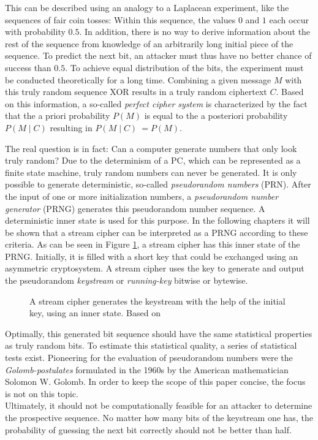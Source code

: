 This can be described using an analogy to a Laplacean experiment, like the sequences of fair coin tosses: Within this sequence, the values $0$ and $1$ each occur with probability $0.5$. In addition, there is no way to derive information about the rest of the sequence from knowledge of an arbitrarily long initial piece of the sequence. To predict the next bit, an attacker must thus have no better chance of success than $0.5$. To achieve equal distribution of the bits, the experiment must be conducted theoretically for a long time. Combining a given message $M$ with this truly random sequence XOR results in a truly random ciphertext $C$. Based on this information, a so-called \textit{perfect cipher system} is characterized by the fact that the a priori probability $P\left(M\right)$ is equal to the a posteriori probability $P({M}\mid{C})$ resulting in $P({M}\mid{C})\ = P({M})$. \cite[pp. 52-23]{Ertel.2020}

\pagebreak

The real question is in fact: Can a computer generate numbers that only look truly random? Due to the determinism of a PC, which can be represented as a finite state machine, truly random numbers can never be generated. It is only possible to generate deterministic, so-called \textit{pseudorandom numbers} (PRN). After the input of one or more initialization numbers, a \textit{pseudorandom number generator} (PRNG) generates this pseudorandom number sequence. A deterministic inner state is used for this purpose. \cite[pp. 195-196]{Ertel.2020} In the following chapters it will be shown that a stream cipher can be interpreted as a PRNG according to these criteria. As can be seen in Figure \ref{fig:Figure_2}, a stream cipher has this inner state of the PRNG. Initially, it is filled with a short key that could be exchanged using an asymmetric cryptosystem. A stream cipher uses the key to generate and output the pseudorandom \textit{keystream} or \textit{running-key} bitwise or bytewise. \cite[p. 233]{Schneier.2006} \\

\begin{figure}[h]
	\centering
	
	\caption{A stream cipher generates the keystream with the help of the initial key, using an inner state. Based on \cite[p. 234]{Schneier.2006}}
	\label{fig:Figure_2}
\end{figure}

Optimally, this generated bit sequence should have the same statistical properties as truly random bits. To estimate this statistical quality, a series of statistical tests exist. Pioneering for the evaluation of pseudorandom numbers were the \textit{Golomb-postulates} formulated in the 1960s by the American mathematician Solomon W. Golomb. \cite[p. 43]{Golomb.1967} In order to keep the scope of this paper concise, the focus is not on this topic.\\

Ultimately, it should not be computationally feasible for an attacker to determine the prospective  sequence. No matter how many bits of the keystream one has, the probability of guessing the next bit correctly should not be better than half.
